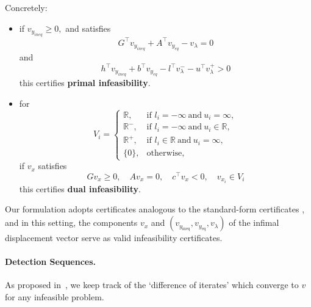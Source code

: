 \documentclass[twoside,12pt,openright]{report}  %
\begin{document}
Concretely:
\begin{itemize}
    \item if \(v_{y_{ineq}} \ge0,\) and satisfies
    \[
    G^\top v_{y_{ineq}} + A^\top v_{y_{eq}} - v_{\lambda} = 0
    \]
    and
    \[
    h^\top v_{y_{ineq}} + b^\top v_{y_{eq}} - l^\top v_{\lambda}^- - u^\top v_{\lambda}^+ > 0
    \]
    this certifies \textbf{primal infeasibility}.
    \item for \[V_i=
\begin{cases}
\mathbb{R}, & \text{if } l_i = -\infty \ \text{and} \ u_i = \infty, \\[0.3em]
\mathbb{R}^-, & \text{if } l_i = -\infty \ \text{and} \ u_i \in \mathbb{R}, \\[0.3em]
\mathbb{R}^+, & \text{if } l_i \in \mathbb{R} \ \text{and} \ u_i = \infty, \\[0.3em]
\{0\}, & \text{otherwise},
\end{cases}
\]
if $v_x$ satisfies
\[
Gv_x \ge 0,\quad Av_x=0,\quad c^\top v_x <0,\quad v_{x_i}\in V_i
\]
this certifies \textbf{dual infeasibility}.
\end{itemize}

Our formulation adopts certificates analogous to the standard-form certificates \cite{applegate2021infeasibility}, and in this setting, the components \(v_x\) and \((v_{y_{\mathrm{ineq}}}, v_{y_{\mathrm{eq}}}, v_{\lambda})\) of the infimal displacement vector serve as valid infeasibility certificates.

\paragraph{Detection Sequences.}
As proposed in~\cite{applegate2021infeasibility}, we keep track of the `difference of iterates' which converge to $v$ for any infeasible problem.

\end{document}
